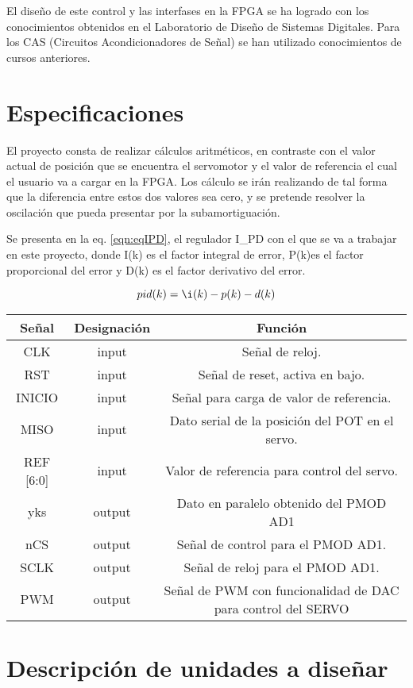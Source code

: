 \documentclass[12pt,a4paper]{article} %
\begin{document}
El diseño de este control y las interfases en la FPGA se ha logrado con los conocimientos obtenidos en el Laboratorio de Diseño de Sistemas Digitales. Para los CAS (Circuitos Acondicionadores de Señal) se han utilizado conocimientos de cursos anteriores.


\section{Especificaciones}

El proyecto consta de realizar cálculos aritméticos, en contraste con el valor actual de posición que se encuentra el servomotor y el valor de referencia el cual el usuario va a cargar en la FPGA. Los cálculo se irán realizando de tal forma que la diferencia entre estos dos valores sea cero, y se pretende resolver la oscilación que pueda presentar por la subamortiguación.

Se presenta en la eq. \ref{eqn:eqIPD}, el regulador I\_PD con el que se va a trabajar en este proyecto, donde I(k) es el factor integral de error, P(k)es el factor proporcional del error y D(k) es el factor derivativo del error.

\begin{equation}\label{eqn:eqIPD}
pid(k)=\i(k)-p(k)-d(k)
\end{equation}

\begin{tabular}{c||c||c}
Señal & Designación & Función\\
\hline
\hline
CLK & input & Señal de reloj. \\
RST & input & Señal de reset, activa en bajo. \\
INICIO & input & Señal para carga de valor de referencia.\\
MISO & input & Dato serial de la posición del POT en el servo.\\
REF [6:0] & input & Valor de referencia para control del servo.\\
\hline
yks & output & Dato en paralelo obtenido del PMOD AD1\\
nCS & output & Señal de control para el PMOD AD1. \\
SCLK & output & Señal de reloj para el PMOD AD1. \\
PWM & output & Señal de PWM con funcionalidad de DAC para control del SERVO \\
\end{tabular}

\section{Descripción de unidades a diseñar}
\end{document}
